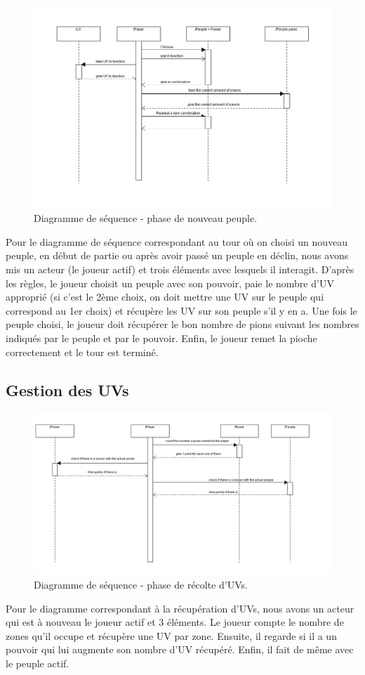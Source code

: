 \documentclass[11pt]{report}
\begin{document}
				\begin{figure}[!h]
\centering
\includegraphics[width=15cm]{NouveauPeuplesequence.png}
\caption{Diagramme de séquence - phase de nouveau peuple.}
\end{figure}
		Pour le diagramme de séquence correspondant au tour où on choisi un nouveau peuple, en début de partie ou après avoir passé un peuple en déclin, nous avons mis un acteur (le joueur actif) et trois éléments avec lesquels il interagit. D'après les règles, le joueur choisit un peuple avec son pouvoir, paie le nombre d'UV approprié (si c'est le 2ème choix, on doit mettre une UV sur le peuple qui correspond au 1er choix) et récupère les UV sur son peuple s'il y en a. Une fois le peuple choisi, le joueur doit récupérer le bon nombre de pions suivant les nombres indiqués par le peuple et par le pouvoir. Enfin, le joueur remet la pioche correctement et le tour est terminé.

		\subsection{Gestion des UVs}
				\begin{figure}[!h]
\centering
\includegraphics[width=13cm]{Pointssequence.png}
\caption{Diagramme de séquence - phase de récolte d'UVs.}
\end{figure}
		Pour le diagramme correspondant à la récupération d'UVs, nous avons un acteur qui est à nouveau le joueur actif et 3 éléments. Le joueur compte le nombre de zones qu'il occupe et récupère une UV par zone. Ensuite, il regarde si il a un pouvoir qui lui augmente son nombre d'UV récupéré. Enfin, il fait de même avec le peuple actif.
\end{document}
